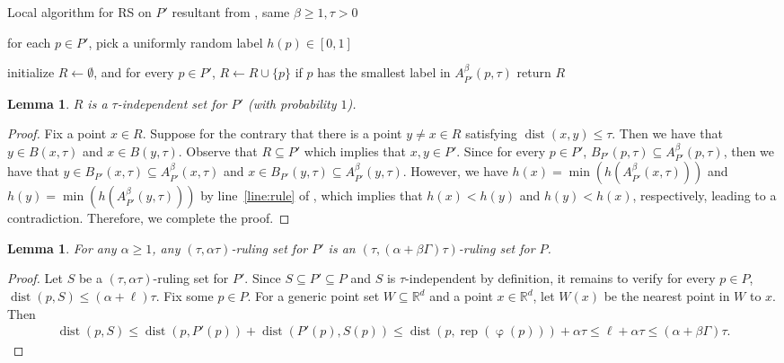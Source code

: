 \documentclass[11pt,letterpaper]{article}
\theoremstyle{plain}
\newtheorem{lemma}[theorem]{Lemma}
\theoremstyle{definition}
\theoremstyle{remark}
\DeclareMathOperator{\dist}{dist}
\DeclareMathOperator*{\hash}{\varphi}
\DeclareMathOperator*{\rep}{rep}
\begin{document}
\begin{algorithm}
    \caption{Local algorithm for RS on $P'$ resultant from , same $\beta \geq 1, \tau > 0$}
    \label{alg:local_kcenter}
    \begin{algorithmic}[1]
\State for each $p\in P'$, pick a uniformly random label $h(p)\in [0,1]$
        
        \State initialize $R\gets \emptyset$, and for every $p \in P'$, $R \gets R \cup \{p\}$ if $p$ has the smallest label in $A_{P'}^{\beta}(p, \tau)$ 
            \label{line:rule}
        \State return $R$
    \end{algorithmic}
\end{algorithm}
    \begin{lemma}
        \label{lemma:C_independent_set}
$R$ is a $\tau$-independent set for $P'$ (with probability $1$).  
    \end{lemma}
\begin{proof} 
        Fix a point $x\in R$. 
        Suppose for the contrary that there is a point $y \neq x \in R$ satisfying $\dist(x, y)\leq \tau$. 
        Then we have that $y\in B(x, \tau)$ and $x\in B(y,\tau)$.  
        Observe that $R\subseteq P'$ which implies that $x, y\in P'$. 
        Since for every $p\in P'$, $B_{P'}(p, \tau)\subseteq A_{P'}^{\beta}(p, \tau)$, then we have that $y\in B_{P'}(x, \tau)\subseteq A_{P'}^{\beta}(x, \tau)$ and $x\in B_{P'}(y, \tau)\subseteq A_{P'}^{\beta}(y, \tau)$.  
        However, we have $h(x) = \min(h(A_{P'}^{\beta}(x, \tau)))$ and $h(y)=\min(h(A_{P'}^{\beta}(y, \tau)))$ by line~\ref{line:rule} of ,
        which implies that $h(x)<h(y)$ and $h(y)<h(x)$, respectively, leading to a contradiction. 
        Therefore, we complete the proof. 
    \end{proof}

    \begin{lemma}
        \label{lemma:rs_Pprime_to_P}
        For any $\alpha \geq 1$,
        any $(\tau, \alpha \tau)$-ruling set for $P'$
        is an $(\tau, (\alpha + \beta\Gamma) \tau)$-ruling set for $P$.
    \end{lemma}
    \begin{proof}
        Let $S$ be a $(\tau, \alpha \tau)$-ruling set for $P'$.
        Since $S \subseteq P' \subseteq P$ and $S$ is $\tau$-independent by definition,
        it remains to verify for every $p \in P$, $\dist(p, S) \leq (\alpha + \ell) \tau$.
        Fix some $p \in P$.
        For a generic point set $W \subseteq \mathbb{R}^d$ and a point $x \in \mathbb{R}^d$,
        let $W(x)$ be the nearest point in $W$ to $x$.
        Then
        \begin{align*}
            \dist(p, S)
            \leq \dist(p, P'(p)) + \dist(P'(p), S(p))
            \leq \dist(p, \rep(\hash(p))) + \alpha \tau
            \leq \ell + \alpha \tau \leq (\alpha + \beta\Gamma) \tau.
        \end{align*}
    \end{proof}
\end{document}
